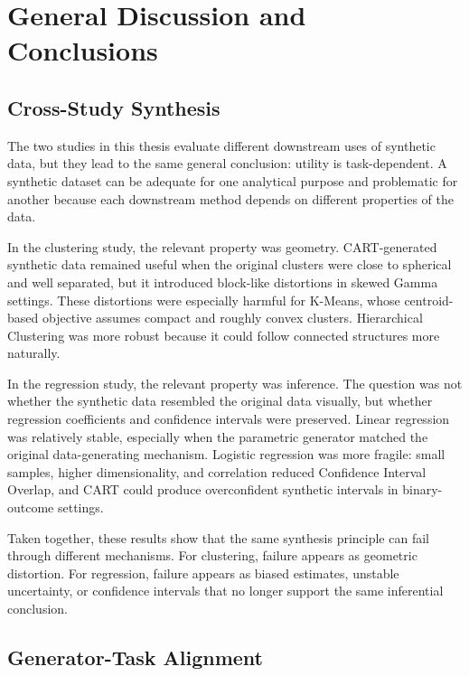 \chapter{General Discussion and Conclusions}
\label{chap:general-conclusions}

\section{Cross-Study Synthesis}
\label{sec:general-cross-study-synthesis}

The two studies in this thesis evaluate different downstream uses of synthetic data, but they lead to the same general conclusion: utility is task-dependent. A synthetic dataset can be adequate for one analytical purpose and problematic for another because each downstream method depends on different properties of the data.

In the clustering study, the relevant property was geometry. CART-generated synthetic data remained useful when the original clusters were close to spherical and well separated, but it introduced block-like distortions in skewed Gamma settings. These distortions were especially harmful for K-Means, whose centroid-based objective assumes compact and roughly convex clusters. Hierarchical Clustering was more robust because it could follow connected structures more naturally.

In the regression study, the relevant property was inference. The question was not whether the synthetic data resembled the original data visually, but whether regression coefficients and confidence intervals were preserved. Linear regression was relatively stable, especially when the parametric generator matched the original data-generating mechanism. Logistic regression was more fragile: small samples, higher dimensionality, and correlation reduced Confidence Interval Overlap, and CART could produce overconfident synthetic intervals in binary-outcome settings.

Taken together, these results show that the same synthesis principle can fail through different mechanisms. For clustering, failure appears as geometric distortion. For regression, failure appears as biased estimates, unstable uncertainty, or confidence intervals that no longer support the same inferential conclusion.

\section{Generator-Task Alignment}
\label{sec:generator-task-alignment}

